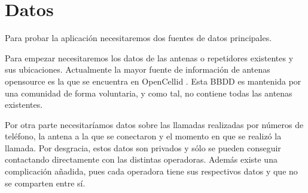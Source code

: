   \section{Datos}
  Para probar la aplicación necesitaremos dos fuentes de datos principales.
  
  Para empezar necesitaremos los datos de las antenas o repetidores existentes y sus ubicaciones. Actualmente la mayor fuente de información de antenas opensource es la que se encuentra en OpenCellid \cite{opencellid}. Esta BBDD es mantenida por una comunidad de forma voluntaria, y como tal, no contiene todas las antenas existentes.
  
  Por otra parte necesitaríamos datos sobre las llamadas realizadas por números de teléfono, la antena a la que se conectaron y el momento en que se realizó la llamada. Por desgracia, estos datos son privados y sólo se pueden conseguir contactando directamente con las distintas operadoras. Además existe una complicación añadida, pues cada operadora tiene sus respectivos datos y que no se comparten entre sí.